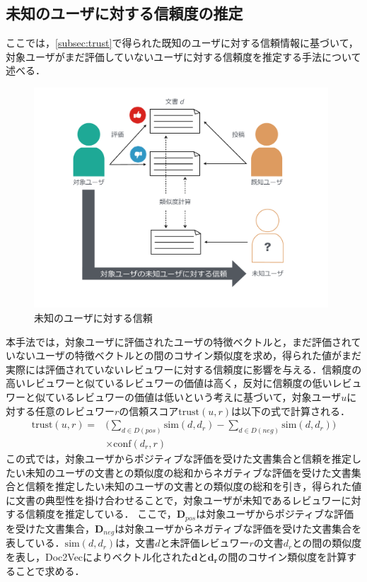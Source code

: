 \documentclass[a4paper,11pt,oneside,openany]{jsbook}
\begin{document}
	\subsection{未知のユーザに対する信頼度の推定}
\label{subsubsec:weight}
ここでは，\ref{subsec:trust}で得られた既知のユーザに対する信頼情報に基づいて，対象ユーザがまだ評価していないユーザに対する信頼度を推定する手法について述べる．
\begin{figure}[tb]
	\begin{center} %
		\includegraphics[width = 110mm]{figures/trust2.pdf} %
	\end{center}
	\caption{未知のユーザに対する信頼} %
	\label{fig:trust2} %
\end{figure}
本手法では，対象ユーザに評価されたユーザの特徴ベクトルと，まだ評価されていないユーザの特徴ベクトルとの間のコサイン類似度を求め，得られた値がまだ実際には評価されていないレビュワーに対する信頼度に影響を与える．信頼度の高いレビュワーと似ているレビュワーの価値は高く，反対に信頼度の低いレビュワーと似ているレビュワーの価値は低いという考えに基づいて，対象ユーザ$u$に対する任意のレビュワー$r$の信頼スコア$\mathrm{trust}(u, r)$は以下の式で計算される．
\begin{equation}
\begin{split}
\mathrm{trust}(u ,r) = &\bigl(\sum_{d\in{D(pos)}}\mathrm{sim}(d, d_{r})-\sum_{d\in{D(neg)}}\mathrm{sim}(d, d_{r})\bigr)\\
&\times\mathrm{conf}(d_{r}, r)
\end{split}
\end{equation}
この式では，対象ユーザからポジティブな評価を受けた文書集合と信頼を推定したい未知のユーザの文書との類似度の総和からネガティブな評価を受けた文書集合と信頼を推定したい未知のユーザの文書との類似度の総和を引き，得られた値に文書の典型性を掛け合わせることで，対象ユーザが未知であるレビュワーに対する信頼度を推定している．
ここで，$\mathbf{D}_{pos}$は対象ユーザからポジティブな評価を受けた文書集合，$\mathbf{D}_{neg}$は対象ユーザからネガティブな評価を受けた文書集合を表している．$\mathrm{sim}(d, d_{r})$は，文書$d$と未評価レビュワー$r$の文書$d_r$との間の類似度を表し，Doc2Vecによりベクトル化された$\mathbf{d}$と$\mathbf{d_r}$の間のコサイン類似度を計算することで求める．
\end{document}

